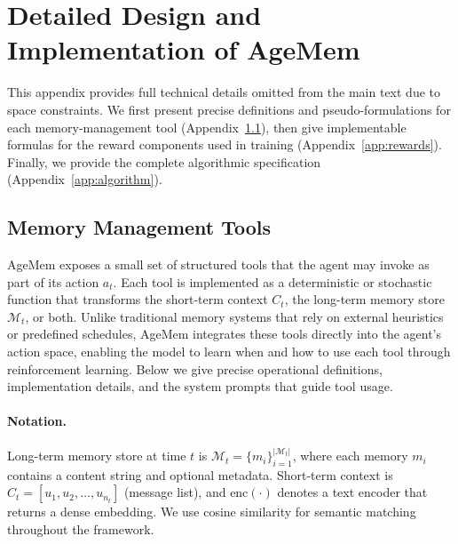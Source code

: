 \appendix
\section{Detailed Design and Implementation of AgeMem}
\label{app:details}

This appendix provides full technical details omitted from the main text due to space constraints. We first present precise definitions and pseudo-formulations for each memory-management tool (Appendix~\ref{app:tools}), then give implementable formulas for the reward components used in training (Appendix~\ref{app:rewards}). Finally, we provide the complete algorithmic specification (Appendix~\ref{app:algorithm}).

\subsection{Memory Management Tools}
\label{app:tools}

AgeMem exposes a small set of structured tools that the agent may invoke as part of its action \(a_t\). Each tool is implemented as a deterministic or stochastic function that transforms the short-term context \(C_t\), the long-term memory store \(\mathcal{M}_t\), or both. Unlike traditional memory systems that rely on external heuristics or predefined schedules, AgeMem integrates these tools directly into the agent's action space, enabling the model to learn when and how to use each tool through reinforcement learning. Below we give precise operational definitions, implementation details, and the system prompts that guide tool usage.

\paragraph{Notation.}  
Long-term memory store at time \(t\) is \(\mathcal{M}_t = \{m_i\}_{i=1}^{|\mathcal{M}_t|}\), where each memory \(m_i\) contains a content string and optional metadata. Short-term context is \(C_t = [u_1, u_2, \ldots, u_{n_t}]\) (message list), and \(\text{enc}(\cdot)\) denotes a text encoder that returns a dense embedding. We use cosine similarity for semantic matching throughout the framework.


